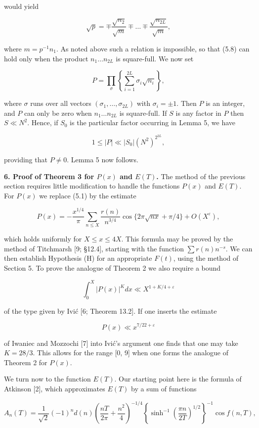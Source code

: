 \documentclass[10pt]{article}
\newcommand{\articleSection}[2]{%
  \par\medskip\noindent\textbf{#1. #2.}\enspace
}
\begin{document}
would yield

$$
\sqrt{p}=\mp \frac{\sqrt{n_{2}}}{\sqrt{m}} \mp \ldots \mp \frac{\sqrt{n_{2 L}}}{\sqrt{m}},
$$

where $m=p^{-1} n_{1}$. As noted above such a relation is impossible, so that (5.8) can hold only when the product $n_{1} \ldots n_{2 L}$ is square-full. We now set

$$
P=\prod_{\sigma}\left\{\sum_{i=1}^{2 L} \sigma_{i} \sqrt{n_{i}}\right\},
$$

where $\sigma$ runs over all vectors $\left(\sigma_{1}, \ldots, \sigma_{2 L}\right)$ with $\sigma_{i}= \pm 1$. Then $P$ is an integer, and $P$ can only be zero when $n_{1} \ldots n_{2 L}$ is square-full. If $S$ is any factor in $P$ then $S \ll N^{2}$. Hence, if $S_{0}$ is the particular factor occurring in Lemma 5, we have

$$
1 \leq|P| \ll\left|S_{0}\right|\left(N^{2}\right)^{2^{2 L}},
$$

providing that $P \neq 0$. Lemma 5 now follows.

\articleSection{6}{Proof of Theorem 3 for $P(x)$ and $E(T)$}The method of the previous section requires little modification to handle the functions $P(x)$ and $E(T)$. For $P(x)$ we replace (5.1) by the estimate

$$
P(x)=-\frac{x^{1 / 4}}{\pi} \sum_{n \leq X} \frac{r(n)}{n^{3 / 4}} \cos \{2 \pi \sqrt{n x}+\pi / 4\}+O\left(X^{\varepsilon}\right),
$$

which holds uniformly for $X \leq x \leq 4 X$. This formula may be proved by the method of Titchmarsh [9; §12.4], starting with the function $\sum r(n) n^{-s}$. We can then establish Hypothesis (H) for an appropriate $F(t)$, using the method of Section 5. To prove the analogue of Theorem 2 we also require a bound

$$
\int_{0}^{X}|P(x)|^{K} d x \ll X^{1+K / 4+\varepsilon}
$$

of the type given by Ivić [6; Theorem 13.2]. If one inserts the estimate

$$
P(x) \ll x^{7 / 22+\varepsilon}
$$

of Iwaniec and Mozzochi [7] into Ivić's argument one finds that one may take $K=28 / 3$. This allows for the range [0, 9] when one forms the analogue of Theorem 2 for $P(x)$.

We turn now to the function $E(T)$. Our starting point here is the formula of Atkinson [2], which approximates $E(T)$ by a sum of functions

$$
A_{n}(T)=\frac{1}{\sqrt{2}}(-1)^{n} d(n)\left(\frac{n T}{2 \pi}+\frac{n^{2}}{4}\right)^{-1 / 4}\left\{\sinh ^{-1}\left(\frac{\pi n}{2 T}\right)^{1 / 2}\right\}^{-1} \cos f(n, T),
$$
\end{document}

